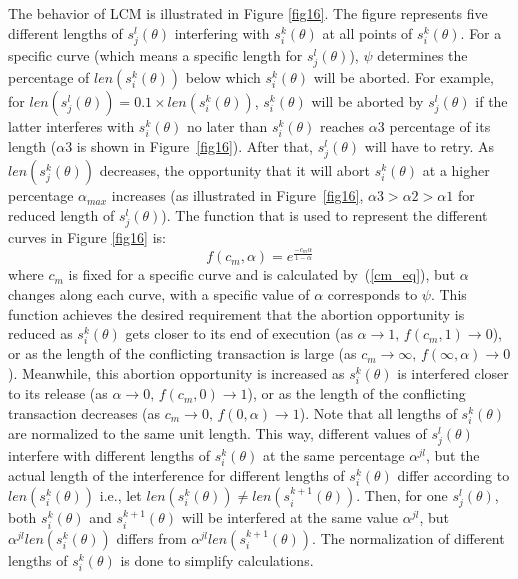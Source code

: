 \documentclass[conference]{IEEEtran}
\begin{document}
The behavior of LCM  is illustrated in Figure \ref{fig16}. The figure represents five different lengths of $s_{j}^{l}(\theta)$
interfering with $s_{i}^{k}(\theta)$ at all points of $s_{i}^{k}(\theta)$.
For a specific curve (which means a specific length for $s_{j}^{l}(\theta)$),
$\psi$ determines the percentage of $len(s_{i}^{k}(\theta))$
below which $s_{i}^{k}(\theta)$ will be aborted. For example, for
$len(s_{j}^{l}(\theta))=0.1\times len(s_{i}^{k}(\theta))$, $s_{i}^{k}(\theta)$
will be aborted by $s_{j}^{l}(\theta)$ if the latter interferes with
$s_{i}^{k}(\theta)$ no later than $s_{i}^{k}(\theta)$ reaches $\alpha3$
percentage of its length ($\alpha3$ is shown in Figure~\ref{fig16}). After that, $s_{j}^{l}(\theta)$ will have
to retry. As $len(s_{j}^{k}(\theta))$ decreases, the opportunity
that it will abort $s_{i}^{k}(\theta)$ at a higher percentage $\alpha_{max}$
increases (as illustrated in Figure~\ref{fig16}, $\alpha3>\alpha2>\alpha1$ for reduced length of $s_j^l(\theta)$). The function that is used to represent the 
different curves in Figure \ref{fig16} is:
 \begin{equation}
f(c_{m},\alpha)=e^{\frac{-c_{m}\alpha}{1-\alpha}}\label{eq49}\end{equation}
where $c_{m}$ is fixed for a specific curve and is calculated by~(\ref{cm_eq}), but $\alpha$ changes
along each curve, with a specific value of $\alpha$ corresponds to $\psi$. This function achieves the desired requirement 
that the abortion opportunity is reduced as $s_{i}^{k}(\theta)$ gets
closer to its end of execution (as $\alpha\rightarrow1,\, f(c_{m},1)\rightarrow0$),
or as the length of the conflicting transaction is large (as $c_{m}\rightarrow\infty,\, f(\infty,\alpha)\rightarrow0$).
Meanwhile, this abortion opportunity is increased as $s_{i}^{k}(\theta)$
is interfered closer to its release (as $\alpha\rightarrow0,\, f(c_{m},0)\rightarrow1$),
or as the length of the conflicting transaction decreases (as $c_{m}\rightarrow0,\, f(0,\alpha)\rightarrow1$).
Note that all lengths of $s_{i}^{k}(\theta)$ are normalized
to the same unit length. This way, different values of $s_{j}^{l}(\theta)$
interfere with 
different lengths of $s_{i}^{k}(\theta)$ at the same percentage
$\alpha^{jl}$, but the actual length of the interference 
for different
lengths of $s_{i}^{k}(\theta)$ differ according to $len(s_{i}^{k}(\theta))$ i.e., let $len(s_{i}^{k}(\theta))\ne len(s_{i}^{k+1}(\theta))$. Then, for one $s_{j}^{l}(\theta)$, both $s_{i}^{k}(\theta)$ and $s_{i}^{k+1}(\theta)$
will be interfered at the same value $\alpha^{jl}$, but $\alpha^{jl}len(s_{i}^{k}(\theta))$
differs from $\alpha^{jl}len(s_{i}^{k+1}(\theta))$. The normalization
of different lengths of $s_{i}^{k}(\theta)$ is done to simplify calculations.
\end{document}
